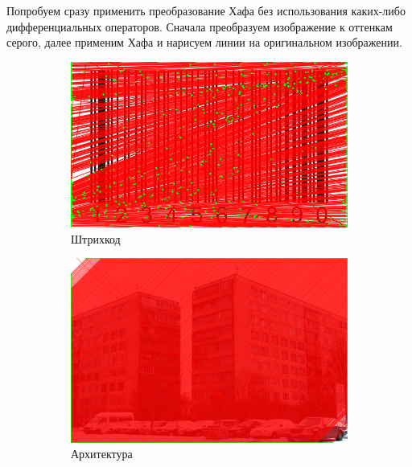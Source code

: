 \documentclass[a4paper, 16pt]{article}
\begin{document}
    \noindent Попробуем сразу применить преобразование Хафа без использования каких-либо дифференциальных операторов.
    Сначала преобразуем изображение к оттенкам серого, далее применим Хафа и нарисуем линии на оригинальном изображении.
    \begin{figure}[htbp]
        \centering
        \begin{subfigure}{0.3\textwidth}
            \centering
            \includegraphics[width=\linewidth]{hl_i1.png}
            \caption{Штрихкод}
            \label{fig:hl_i1}
        \end{subfigure}
        \hfill
        \begin{subfigure}{0.3\textwidth}
            \centering
            \includegraphics[width=\linewidth]{hl_i2.png}
            \caption{Архитектура}
            \label{fig:hl_i2}
        \end{subfigure}
        \hfill
        \begin{subfigure}{0.3\textwidth}

\end{subfigure}
\end{figure}
\end{document}
